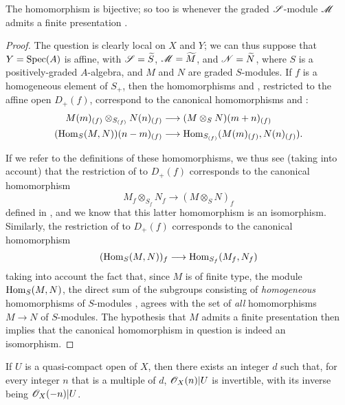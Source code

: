 
\begin{proposition}[8.14.3]
\label{II.8.14.3}
The homomorphism  is bijective;
so too is  whenever the graded $\mathscr{S}$-module $\mathscr{M}$ admits a finite presentation .
\end{proposition}

\begin{proof}
The question is clearly local on $X$ and $Y$;
we can thus suppose that $Y=\operatorname{Spec}(A)$ is affine, with $\mathscr{S}=\widetilde{S}$, $\mathscr{M}=\widetilde{M}$, and $\mathscr{N}=\widetilde{N}$, where $S$ is a positively-graded $A$-algebra, and $M$ and $N$ are graded $S$-modules.
If $f$ is a homogeneous element of $S_+$, then the homomorphisms  and , restricted to the affine open $D_+(f)$, correspond to the canonical homomorphisms  and :
\begin{align*}
    M(m)_{(f)}\otimes_{S_{(f)}}N(n)_{(f)}
    &\to
    (M\otimes_S N)(m+n)_{(f)}
\\  (\Hom_S(M,N))(n-m)_{(f)}
    &\to
    \Hom_{S_{(f)}}(M(m)_{(f)},N(n)_{(f)}).
\end{align*}

If we refer to the definitions of these homomorphisms, we thus see (taking  into account) that the restriction of  to $D_+(f)$ corresponds to the canonical homomorphism
\[
    M_f\otimes_{S_f}N_f \to (M\otimes_S N)_f
\]
defined in , and we know that this latter homomorphism is an isomorphism.
Similarly, the restriction of  to $D_+(f)$ corresponds to the canonical homomorphism 
\[
    (\Hom_S(M,N))_f \to \Hom_{S_f}(M_f,N_f)
\]
taking into account the fact that, since $M$ is of finite type, the module $\operatorname{Hom}_S(M,N)$, the direct sum of the subgroups consisting of \emph{homogeneous} homomorphisms of $S$-modules , agrees with the set of \emph{all} homomorphisms $M\to N$ of $S$-modules.
The hypothesis that $M$ admits a finite presentation then implies  that the canonical homomorphism in question is indeed an isomorphism.
\end{proof}

\begin{proposition}[8.14.4]
\label{II.8.14.4}
If $U$ is a quasi-compact open of $X$, then there exists an integer $d$ such that, for every integer $n$ that is a multiple of $d$, $\mathscr{O}_X(n)|U$ is invertible, with its inverse being $\mathscr{O}_X(-n)|U$.
\end{proposition}

